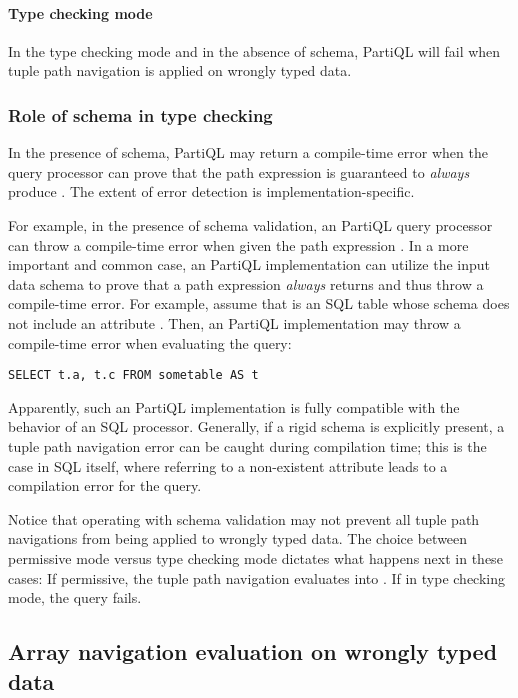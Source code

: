 \paragraph{Type checking mode} In the type checking mode and in the
absence of schema, PartiQL will fail when tuple path navigation is applied on
wrongly typed data.

\subsubsection{Role of schema in type checking}
\label{sec:schema-in-tuple-path}

In the presence of schema, PartiQL may return a compile-time error when the
query processor can prove that the path expression is guaranteed to
\textit{always} produce \MISSING. The extent of error detection is
implementation-specific. 

For example, in the presence of schema validation, an PartiQL query processor
can throw a compile-time error when given the path expression . In a more important and common case, an PartiQL implementation can
utilize the input data schema to prove that a path expression \textit{always}
returns \MISSING and thus throw a compile-time error. For example, assume
that  is an SQL table whose schema does not include an attribute
. Then, an PartiQL implementation may throw a compile-time error when
evaluating the query:

\begin{lstlisting}
SELECT t.a, t.c FROM sometable AS t
\end{lstlisting}

Apparently, such an PartiQL implementation is fully compatible with the behavior
of an SQL processor. Generally, if a rigid schema is explicitly present, a tuple
path navigation error can be caught during compilation time; this is the case in
SQL itself, where referring to a non-existent attribute leads to a compilation
error for the query.

Notice that operating with schema validation may not prevent all tuple path
navigations from being applied to wrongly typed data. The choice between
permissive mode versus type checking mode dictates what happens next in these
cases: If permissive, the tuple path navigation evaluates into \MISSING. If
in type checking mode, the query fails.

\subsection{Array navigation evaluation on wrongly typed data}
\label{sec:array-on-wrong}

